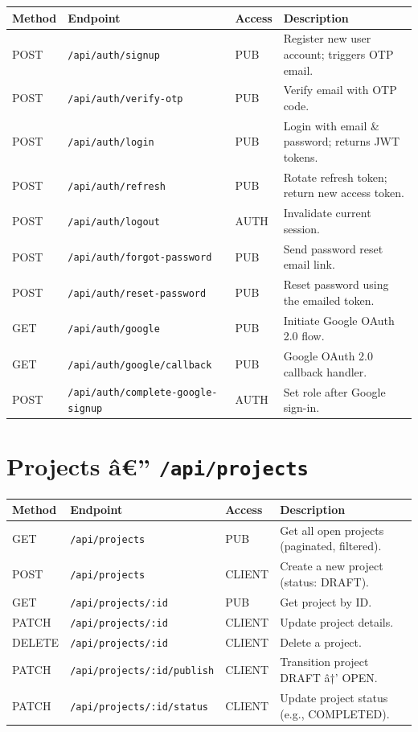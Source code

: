 \begin{longtable}{p{1.5cm} p{5.5cm} p{1.5cm} p{5.5cm}}
\toprule
\textbf{Method} & \textbf{Endpoint} & \textbf{Access} & \textbf{Description} \\
\midrule
\endhead
\bottomrule
\endfoot
POST & \texttt{/api/auth/signup}            & PUB    & Register new user account; triggers OTP email. \\
POST & \texttt{/api/auth/verify-otp}        & PUB    & Verify email with OTP code. \\
POST & \texttt{/api/auth/login}             & PUB    & Login with email \& password; returns JWT tokens. \\
POST & \texttt{/api/auth/refresh}           & PUB    & Rotate refresh token; return new access token. \\
POST & \texttt{/api/auth/logout}            & AUTH   & Invalidate current session. \\
POST & \texttt{/api/auth/forgot-password}   & PUB    & Send password reset email link. \\
POST & \texttt{/api/auth/reset-password}    & PUB    & Reset password using the emailed token. \\
GET  & \texttt{/api/auth/google}            & PUB    & Initiate Google OAuth 2.0 flow. \\
GET  & \texttt{/api/auth/google/callback}   & PUB    & Google OAuth 2.0 callback handler. \\
POST & \texttt{/api/auth/complete-google-signup} & AUTH & Set role after Google sign-in. \\
\end{longtable}

\section*{Projects â€” \texttt{/api/projects}}

\begin{longtable}{p{1.5cm} p{5.5cm} p{1.7cm} p{5.3cm}}
\toprule
\textbf{Method} & \textbf{Endpoint} & \textbf{Access} & \textbf{Description} \\
\midrule
\endhead
\bottomrule
\endfoot
GET    & \texttt{/api/projects}               & PUB    & Get all open projects (paginated, filtered). \\
POST   & \texttt{/api/projects}               & CLIENT & Create a new project (status: DRAFT). \\
GET    & \texttt{/api/projects/:id}            & PUB    & Get project by ID. \\
PATCH  & \texttt{/api/projects/:id}            & CLIENT & Update project details. \\
DELETE & \texttt{/api/projects/:id}            & CLIENT & Delete a project. \\
PATCH  & \texttt{/api/projects/:id/publish}    & CLIENT & Transition project DRAFT â†’ OPEN. \\
PATCH  & \texttt{/api/projects/:id/status}     & CLIENT & Update project status (e.g., COMPLETED). \\
\end{longtable}

